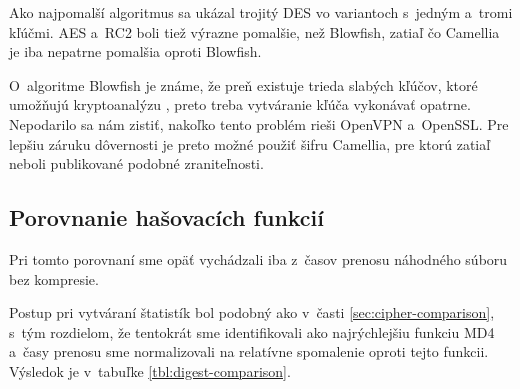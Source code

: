 \documentclass[12pt,a4paper]{article}
\begin{document}
Ako najpomalší algoritmus sa ukázal trojitý DES vo variantoch s~jedným
a~tromi kľúčmi. AES a~RC2 boli tiež výrazne pomalšie, než Blowfish, zatiaľ
čo Camellia je iba nepatrne pomalšia oproti Blowfish.

O~algoritme Blowfish je známe, že preň existuje trieda slabých kľúčov,
ktoré umožňujú kryptoanalýzu \cite{blowfish-weak}, preto treba vytváranie
kľúča vykonávať opatrne. Nepodarilo sa nám zistiť, nakoľko tento problém
rieši OpenVPN a~OpenSSL. Pre lepšiu záruku dôvernosti je preto možné
použiť šifru Camellia, pre ktorú zatiaľ neboli publikované podobné
zraniteľnosti.

\subsection{Porovnanie hašovacích funkcií}

Pri tomto porovnaní sme opäť vychádzali iba z~časov prenosu náhodného
súboru bez kompresie.

Postup pri vytváraní štatistík bol podobný ako v~časti
\ref{sec:cipher-comparison}, s~tým rozdielom, že tentokrát sme
identifikovali ako najrýchlejšiu funkciu MD4 a~časy prenosu sme
normalizovali na relatívne spomalenie oproti tejto funkcii.
Výsledok je v~tabuľke \ref{tbl:digest-comparison}.
\end{document}
